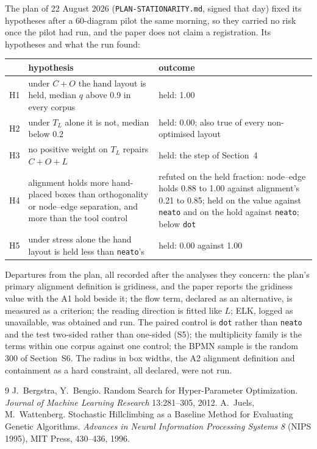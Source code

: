 \documentclass[11pt]{article}
\begin{document}
The plan of 22 August 2026 (\texttt{PLAN-STATIONARITY.md}, signed that day) fixed its
hypotheses after a 60-diagram pilot the same morning, so they carried no risk once the
pilot had run, and the paper does not claim a registration. Its hypotheses and what the run found:

\begin{center}\small
\begin{tabular}{@{}p{1cm}>{\raggedright\arraybackslash}p{7.6cm}>{\raggedright\arraybackslash}p{5.6cm}@{}}
\toprule
& hypothesis & outcome \\
\midrule
H1 & under $C{+}O$ the hand layout is held, median $q$ above 0.9 in every corpus & held: 1.00 \\
H2 & under $T_L$ alone it is not, median below 0.2 & held: 0.00; also true of every non-optimised layout \\
H3 & no positive weight on $T_L$ repairs $C{+}O{+}L$ & held: the step of Section~4 \\
H4 & alignment holds more hand-placed boxes than orthogonality or node--edge separation, and more than the tool control & refuted on the held fraction: node--edge holds 0.88 to 1.00 against alignment's 0.21 to 0.85; held on the value against \texttt{neato} and on the hold against \texttt{neato}; below \texttt{dot} \\
H5 & under stress alone the hand layout is held less than \texttt{neato}'s & held: 0.00 against 1.00 \\
\bottomrule
\end{tabular}
\end{center}

Departures from the plan, all recorded after the analyses they concern: the plan's
primary alignment definition is gridiness, and the paper reports the gridiness value with
the A1 hold beside it; the flow term, declared
as an alternative, is measured as a criterion; the reading direction is fitted like $L$;
ELK, logged as unavailable, was obtained and run. The paired control is \texttt{dot}
rather than \texttt{neato} and the test two-sided rather than one-sided (S5); the
multiplicity family is the terms within one corpus against one control; the BPMN sample is
the random 300 of Section~S6. The radius in box widths, the A2 alignment definition and
containment as a hard constraint, all declared, were not run.


{\footnotesize
\begin{thebibliography}{9}
 J.~Bergstra, Y.~Bengio. Random Search for Hyper-Parameter
 Optimization. \emph{Journal of Machine Learning Research} 13:281--305, 2012.
 A.~Juels, M.~Wattenberg. Stochastic Hillclimbing as a Baseline Method for
 Evaluating Genetic Algorithms. \emph{Advances in Neural Information Processing Systems 8}
 (NIPS 1995), MIT Press, 430--436, 1996.
\end{thebibliography}}
\end{document}
